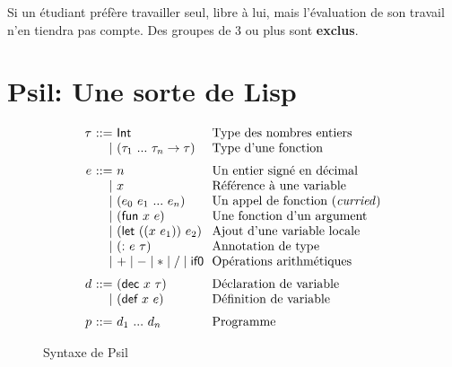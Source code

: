 \documentclass{article}
\begin{document}
Si un étudiant préfère travailler seul, libre à lui, mais l'évaluation de
son travail n'en tiendra pas compte. %
Des groupes de 3 ou plus sont \textbf{exclus}.

\newpage
\section{Psil: Une sorte de Lisp}

\begin{figure}
  \begin{displaymath}
    \begin{array}{r@{~}r@{~}l@{~~}l}
      \tau &::=& \kw{Int} & \text{Type des nombres entiers} \\
      &\mid& (\tau_1~...~\tau_n \to \tau) & \text{Type d'une fonction}
       \medskip \\
      e &::=& n & \text{Un entier signé en décimal} \\
      &\mid& x & \text{Référence à une variable}  \\
      &\mid& (e_0~e_1~...~e_n) &
           \text{Un appel de fonction (\emph{curried})} \\
      &\mid& (\kw{fun}~x~e) & \text{Une fonction d'un argument} \\
      &\mid& (\kw{let}~((x~e_1))~e_2) &
           \text{Ajout d'une variable locale} \\
      &\mid& ({\kw{:}}~e~\tau) & \text{Annotation de type} \\
      &\mid& + \mid - \mid * \mid / \mid \kw{if0} & 
           \text{Opérations arithmétiques}
       \medskip \\
      d &::=& (\kw{dec}~x~\tau) & \text{Déclaration de variable} \\
      &\mid& (\kw{def}~x~e) & \text{Définition de variable}
      \medskip \\
      p &::=& d_1~...~d_n & \text{Programme} \\
      
    \end{array}
  \end{displaymath}
  \caption{Syntaxe de Psil}
  \label{fig:syntaxe}
\end{figure}
\end{document}
